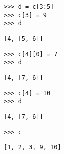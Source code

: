 \begin{blocksection}

\begin{lstlisting}
>>> d = c[3:5]
>>> c[3] = 9
>>> d

\end{lstlisting}
\begin{solution}[.25in]
\begin{lstlisting}
[4, [5, 6]]
\end{lstlisting}
\end{solution}

\begin{lstlisting}
>>> c[4][0] = 7
>>> d
\end{lstlisting}
\begin{solution}[.25in]
\begin{lstlisting}
[4, [7, 6]]
\end{lstlisting}
\end{solution}
\end{blocksection}
\begin{blocksection}
\begin{lstlisting}
>>> c[4] = 10
>>> d
\end{lstlisting}
\begin{solution}[.25in]
\begin{lstlisting}
[4, [7, 6]]
\end{lstlisting}
\end{solution}

\begin{lstlisting}
>>> c
\end{lstlisting}
\begin{solution}[.25in]
\begin{lstlisting}
[1, 2, 3, 9, 10]
\end{lstlisting}
\end{solution}

\end{blocksection}
    
